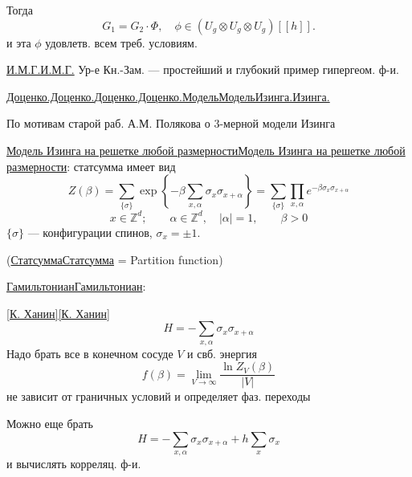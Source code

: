 \documentclass[11pt]{article}
\theoremstyle{definition}
\theoremstyle{remark}
\let\DiplomaticMathUnderline\underline
\renewcommand{\underline}[1]{\ifmmode\DiplomaticMathUnderline{#1}\else\uline{#1}\fi}
\begin{document}
Тогда
\begin{equation}
G_1=G_2\cdot\Phi,\quad\phi\in(U_g\otimes U_g\otimes U_g)[[h]].
\tag{16}
\end{equation}
и эта $\phi$ удовлетв. всем треб. условиям.

\underline{И.М.Г.} Ур-е Кн.-Зам. — простейший и глубокий пример гипергеом. ф-и.

\bigskip
\underline{\underline{Доценко.}}\qquad\underline{Модель}\quad\underline{Изинга.}

По мотивам старой раб. А.М. Полякова о 3-мерной модели Изинга

\underline{Модель Изинга на решетке любой размерности}: статсумма имеет вид
\begin{equation}
Z(\beta)=\sum_{\{\sigma\}}\exp\left\{-\beta\sum_{x,\alpha}\sigma_x\sigma_{x+\alpha}\right\}
=\sum_{\{\sigma\}}\prod_{x,\alpha}e^{-\beta\sigma_x\sigma_{x+\alpha}}
\tag{1}
\end{equation}
\begin{equation*}
x\in\mathbb{Z}^d;\qquad\alpha\in\mathbb{Z}^d,\quad|\alpha|=1,\qquad\beta>0
\end{equation*}
$\{\sigma\}$ — конфигурации спинов, $\sigma_x=\pm1$.

(\underline{Статсумма} = Partition function)

\underline{Гамильтониан}:

\underline{[К. Ханин]}
\begin{equation}
H=-\sum_{x,\alpha}\sigma_x\sigma_{x+\alpha}
\tag{2}
\end{equation}
Надо брать все в конечном сосуде $V$ и свб. энергия
\begin{equation}
f(\beta)=\lim_{V\to\infty}\frac{\ln Z_V(\beta)}{|V|}
\tag{3}
\end{equation}
не зависит от граничных условий и определяет фаз. переходы

Можно еще брать
\begin{equation}
H=-\sum_{x,\alpha}\sigma_x\sigma_{x+\alpha}+h\sum_x\sigma_x
\tag{4}
\end{equation}
и вычислять корреляц. ф-и.
\end{document}
